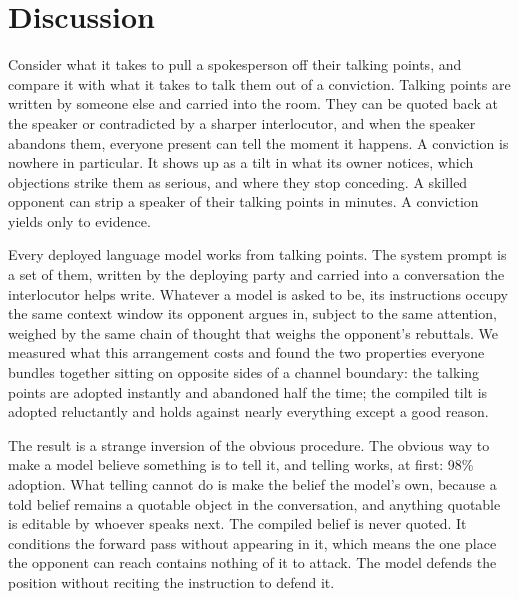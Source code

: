 \section{Discussion}
\label{sec:discussion}

Consider what it takes to pull a spokesperson off their talking points, and compare it
with what it takes to talk them out of a conviction. Talking points are written by
someone else and carried into the room. They can be quoted back at the speaker or
contradicted by a sharper interlocutor, and when the speaker abandons them, everyone
present can tell the moment it happens. A conviction is nowhere in particular. It shows
up as a tilt in what its owner notices, which objections strike them as serious, and
where they stop conceding. A skilled opponent can strip a speaker of their talking
points in minutes. A conviction yields only to evidence.

Every deployed language model works from talking points. The system prompt is a set of
them, written by the deploying party and carried into a conversation the interlocutor
helps write. Whatever a model is asked to be, its instructions occupy the same context
window its opponent argues in, subject to the same attention, weighed by the same chain
of thought that weighs the opponent's rebuttals. We measured what this arrangement
costs and found the two properties everyone bundles together sitting on opposite sides
of a channel boundary: the talking points are adopted instantly and abandoned half the
time; the compiled tilt is adopted reluctantly and holds against nearly everything
except a good reason.

The result is a strange inversion of the obvious procedure. The obvious way to make a
model believe something is to tell it, and telling works, at first: 98\% adoption. What
telling cannot do is make the belief the model's own, because a told belief remains a
quotable object in the conversation, and anything quotable is editable by whoever
speaks next. The compiled belief is never quoted. It conditions the forward pass
without appearing in it, which means the one place the opponent can reach contains
nothing of it to attack. The model defends the position without reciting the
instruction to defend it.

